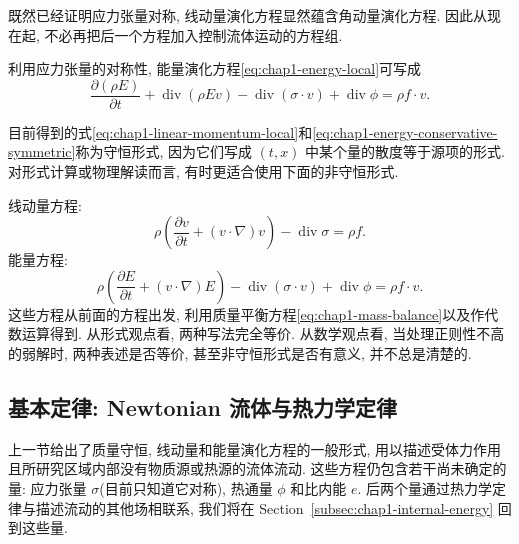 \begin{Remark}
\label{rem:chap1-angular-momentum-redundant}
既然已经证明应力张量对称, 线动量演化方程显然蕴含角动量演化方程. 因此从现在起, 不必再把后一个方程加入控制流体运动的方程组.

利用应力张量的对称性, 能量演化方程\eqref{eq:chap1-energy-local}可写成
\begin{equation}
\label{eq:chap1-energy-conservative-symmetric}
  \frac{\partial(\rho E)}{\partial t}+\operatorname{div}(\rho E v)
  -\operatorname{div}(\sigma\cdot v)+\operatorname{div}\phi=\rho f\cdot v.
\end{equation}
\end{Remark}

\begin{Remark}
\label{rem:chap1-conservative-nonconservative}
目前得到的式\eqref{eq:chap1-linear-momentum-local}和\eqref{eq:chap1-energy-conservative-symmetric}称为守恒形式, 因为它们写成 $(t,x)$ 中某个量的散度等于源项的形式. 对形式计算或物理解读而言, 有时更适合使用下面的非守恒形式.

线动量方程:
\begin{equation}
\label{eq:chap1-linear-momentum-nonconservative}
  \rho\left(\frac{\partial v}{\partial t}+(v\cdot\nabla)v\right)-\operatorname{div}\sigma=\rho f.
\end{equation}
能量方程:
\begin{equation}
\label{eq:chap1-energy-nonconservative}
  \rho\left(\frac{\partial E}{\partial t}+(v\cdot\nabla)E\right)
  -\operatorname{div}(\sigma\cdot v)+\operatorname{div}\phi=\rho f\cdot v.
\end{equation}
这些方程从前面的方程出发, 利用质量平衡方程\eqref{eq:chap1-mass-balance}以及作代数运算得到. 从形式观点看, 两种写法完全等价. 从数学观点看, 当处理正则性不高的弱解时, 两种表述是否等价, 甚至非守恒形式是否有意义, 并不总是清楚的.
\end{Remark}

\subsection{基本定律: Newtonian 流体与热力学定律}
\label{sec:chap1-fundamental-laws}

上一节给出了质量守恒, 线动量和能量演化方程的一般形式, 用以描述受体力作用且所研究区域内部没有物质源或热源的流体流动. 这些方程仍包含若干尚未确定的量: 应力张量 $\sigma$(目前只知道它对称), 热通量 $\phi$ 和比内能 $e$. 后两个量通过热力学定律与描述流动的其他场相联系, 我们将在 Section~\ref{subsec:chap1-internal-energy} 回到这些量.

